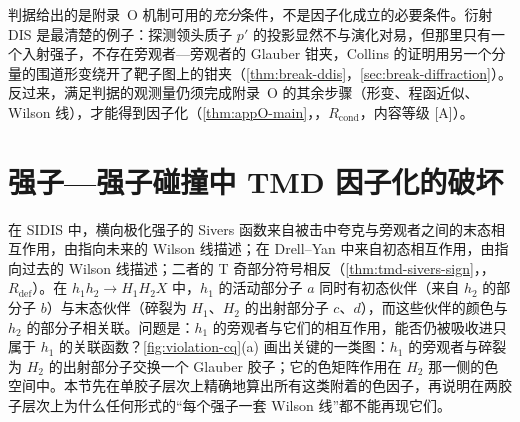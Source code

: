 判据给出的是附录~O 机制可用的\emph{充分}条件，不是因子化成立的必要条件。衍射 DIS 是最清楚的例子：探测领头质子 $p'$ 的投影显然不与演化对易，但那里只有一个入射强子，不存在旁观者—旁观者的 Glauber 钳夹，Collins 的证明用另一个分量的围道形变绕开了靶子图上的钳夹（\cref{thm:break-ddis}，\cref{sec:break-diffraction}）。反过来，满足判据的观测量仍须完成附录~O 的其余步骤（形变、程函近似、Wilson 线），才能得到因子化（\cref{thm:appO-main}，\tagR，$R_{\mathrm{cond}}$，内容等级 [A]）。
\section{强子—强子碰撞中 TMD 因子化的破坏}\label{sec:break-tmd}

在 SIDIS 中，横向极化强子的 Sivers 函数来自被击中夸克与旁观者之间的末态相互作用，由指向未来的 Wilson 线描述；在 Drell--Yan 中来自初态相互作用，由指向过去的 Wilson 线描述；二者的 T 奇部分符号相反（\cref{thm:tmd-sivers-sign}，\tagR，$R_{\mathrm{def}}$）。在 $h_1h_2\to H_1H_2X$ 中，$h_1$ 的活动部分子 $a$ 同时有初态伙伴（来自 $h_2$ 的部分子 $b$）与末态伙伴（碎裂为 $H_1$、$H_2$ 的出射部分子 $c$、$d$），而这些伙伴的颜色与 $h_2$ 的部分子相关联。问题是：$h_1$ 的旁观者与它们的相互作用，能否仍被吸收进只属于 $h_1$ 的关联函数？\cref{fig:violation-cq}(a) 画出关键的一类图：$h_1$ 的旁观者与碎裂为 $H_2$ 的出射部分子交换一个 Glauber 胶子；它的色矩阵作用在 $H_2$ 那一侧的色空间中。本节先在单胶子层次上精确地算出所有这类附着的色因子，再说明在两胶子层次上为什么任何形式的“每个强子一套 Wilson 线”都不能再现它们。

